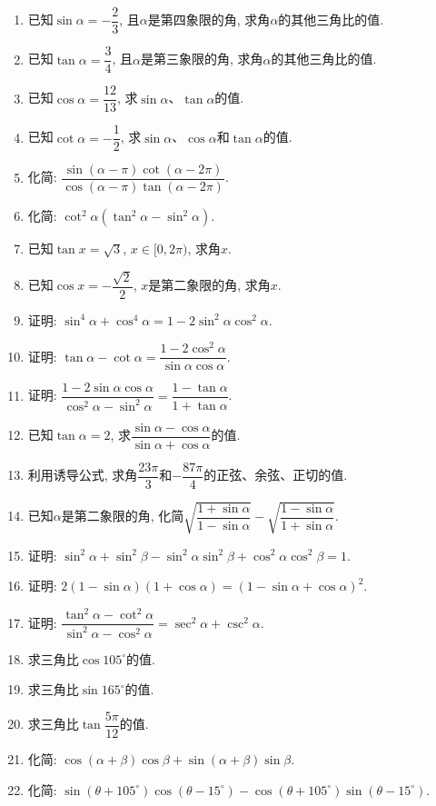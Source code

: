 \documentclass[10pt,a4paper]{article}
\begin{document}
\begin{enumerate}[1.]
\item 已知$\sin \alpha =-\dfrac 23$, 且$\alpha$是第四象限的角, 求角$\alpha$的其他三角比的值.
\item 已知$\tan \alpha =\dfrac 34$, 且$\alpha$是第三象限的角, 求角$\alpha$的其他三角比的值.
\item 已知$\cos \alpha =\dfrac{12}{13}$, 求$\sin \alpha$、$\tan \alpha$的值.
\item 已知$\cot \alpha =-\dfrac 12$, 求$\sin \alpha$、$\cos \alpha$和$\tan \alpha$的值.
\item 化简: $\dfrac{\sin (\alpha -\pi)\cot (\alpha -2\pi)}{\cos (\alpha -\pi)\tan (\alpha -2\pi)}$.
\item 化简: $\cot ^2\alpha (\tan ^2\alpha -\sin ^2\alpha)$.
\item 已知$\tan x=\sqrt 3$, $x\in [0,2\pi)$, 求角$x$.
\item 已知$\cos x=-\dfrac{\sqrt 2}2$, $x$是第二象限的角, 求角$x$.
\item 证明: $\sin ^4\alpha +\cos ^4\alpha =1-2\sin ^2\alpha \cos ^2\alpha$.
\item 证明: $\tan \alpha -\cot \alpha =\dfrac{1-2\cos ^2\alpha}{\sin \alpha \cos \alpha}$.
\item 证明: $\dfrac{1-2\sin \alpha \cos \alpha}{\cos ^2\alpha -\sin ^2\alpha}=\dfrac{1-\tan \alpha}{1+\tan \alpha}$.
\item 已知$\tan \alpha =2$, 求$\dfrac{\sin \alpha -\cos \alpha}{\sin \alpha +\cos \alpha}$的值.
\item 利用诱导公式, 求角$\dfrac{23\pi}3$和$-\dfrac{87\pi}4$的正弦、余弦、正切的值.
\item 已知$\alpha$是第二象限的角, 化简$\sqrt {\dfrac{1+\sin \alpha}{1-\sin \alpha}}-\sqrt {\dfrac{1-\sin \alpha}{1+\sin \alpha}}$.
\item 证明: $\sin ^2\alpha +\sin ^2\beta -\sin ^2\alpha \sin ^2\beta +\cos ^2\alpha \cos ^2\beta =1$.
\item 证明: $2(1-\sin \alpha)(1+\cos \alpha)=(1-\sin \alpha +\cos \alpha)^2$.
\item 证明: $\dfrac{\tan ^2\alpha -\cot ^2\alpha}{\sin ^2\alpha -\cos ^2\alpha}=\sec ^2\alpha +\csc ^2\alpha$.
\item 求三角比$\cos 105^\circ$的值.
\item 求三角比$\sin 165^\circ$的值.
\item 求三角比$\tan \dfrac{5\pi}{12}$的值.
\item 化简: $\cos (\alpha +\beta)\cos \beta +\sin (\alpha +\beta)\sin \beta$.
\item 化简: $\sin (\theta +105^\circ)\cos (\theta -15^\circ)-\cos (\theta +105^\circ)\sin (\theta -15^\circ)$.

\end{enumerate}
\end{document}
